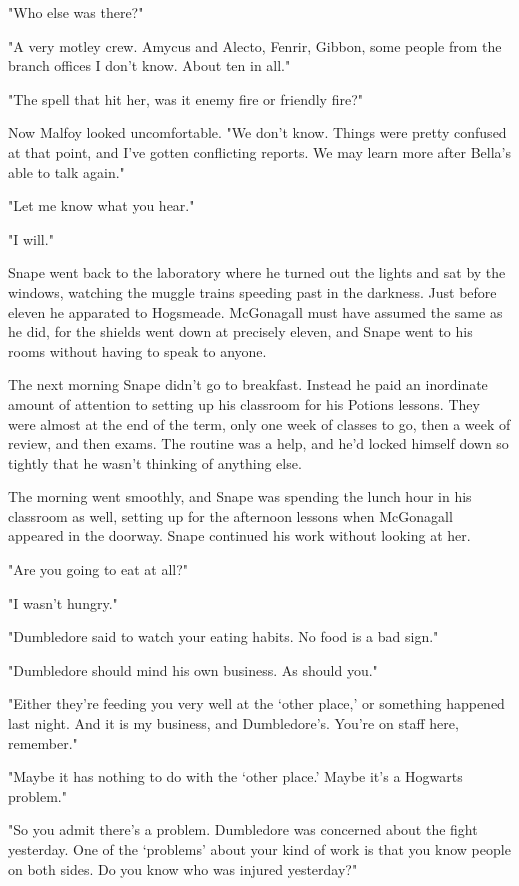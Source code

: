 "Who else was there?"

"A very motley crew. Amycus and Alecto, Fenrir, Gibbon, some people from the branch offices I don't know. About ten in all."

"The spell that hit her, was it enemy fire or friendly fire?"

Now Malfoy looked uncomfortable. "We don't know. Things were pretty confused at that point, and I've gotten conflicting reports. We may learn more after Bella's able to talk again."

"Let me know what you hear."

"I will."

Snape went back to the laboratory where he turned out the lights and sat by the windows, watching the muggle trains speeding past in the darkness. Just before eleven he apparated to Hogsmeade. McGonagall must have assumed the same as he did, for the shields went down at precisely eleven, and Snape went to his rooms without having to speak to anyone.

The next morning Snape didn't go to breakfast. Instead he paid an inordinate amount of attention to setting up his classroom for his Potions lessons. They were almost at the end of the term, only one week of classes to go, then a week of review, and then exams. The routine was a help, and he'd locked himself down so tightly that he wasn't thinking of anything else.

The morning went smoothly, and Snape was spending the lunch hour in his classroom as well, setting up for the afternoon lessons when McGonagall appeared in the doorway. Snape continued his work without looking at her.

"Are you going to eat at all?"

"I wasn't hungry."

"Dumbledore said to watch your eating habits. No food is a bad sign."

"Dumbledore should mind his own business. As should you."

"Either they're feeding you very well at the `other place,' or something happened last night. And it is my business, and Dumbledore's. You're on staff here, remember."

"Maybe it has nothing to do with the `other place.' Maybe it's a Hogwarts problem."

"So you admit there's a problem. Dumbledore was concerned about the fight yesterday. One of the `problems' about your kind of work is that you know people on both sides. Do you know who was injured yesterday?"

